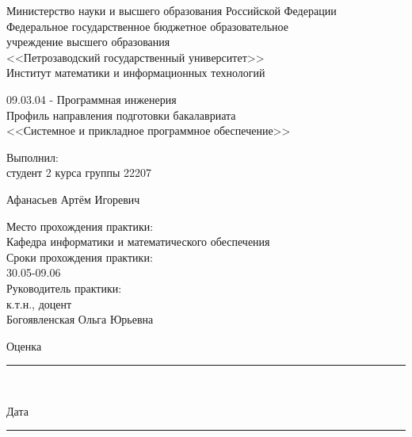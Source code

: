 \documentclass[a4paper,12pt]{article}
\newcommand{\myrule}[1]{\rule{#1}{0.4pt}}
\newcommand{\sign}[2][~]{{\small\myrule{#2}\\[-0.7em]\makebox[#2]{\it #1}}}
\renewcommand{\baselinestretch}{1.50}
\begin{document}
\thispagestyle{empty}
\begin{center}
\renewcommand{\baselinestretch}{1}
{\normalsize {Министерство науки и высшего образования Российской Федерации\\
Федеральное государственное бюджетное образовательное\\
учреждение высшего образования\\}
\large
{\sc <<Петрозаводский государственный университет>>\\
Институт математики и информационных технологий
}
}
\end{center}


\begin{center}
09.03.04 - Программная инженерия\\
Профиль направления подготовки бакалавриата\\
<<Системное и прикладное программное обеспечение>>\\
\end{center}

\vfill

\begin{center}
\medskip
	{\Large {}}
\end{center}

\vfill
\vfill
\vfill

\medskip

\begin{flushright}
\parbox{9cm}{%
\renewcommand{\baselinestretch}{1.2}
\normalsize
	Выполнил:\\
студент 2 курса группы 22207
\begin{flushright}
Афанасьев Артём Игоревич
\end{flushright}
Место прохождения практики: \\
Кафедра информатики и математического обеспечения\\

Сроки прохождения практики: \\
30.05-09.06\\

Руководитель практики:\\
к.т.н., доцент\\
Богоявленская Ольга Юрьевна\\

\begin{flushright}
Оценка
  \sign[]{4cm}
\end{flushright}

\begin{flushright}
Дата
  \sign[]{4cm}
\end{flushright}
}
\end{flushright}
\end{document}
